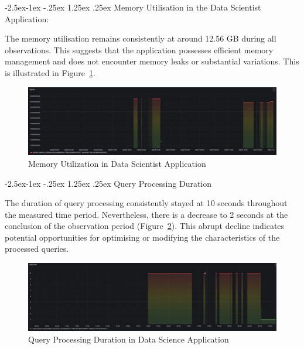 \documentclass[preprint,12pt]{elsarticle}
\makeatletter
\renewcommand\paragraph{\@startsection{paragraph}{4}{\z@}%
            {-2.5ex\@plus -1ex \@minus -.25ex}%
            {1.25ex \@plus .25ex}%
            {\normalfont\normalsize\itshape}}
\makeatother
\begin{document}
\paragraph{Memory Utilisation in the Data Scientist Application:}

The memory utilisation remains consistently at around 12.56 GB during all observations. This suggests that the application possesses efficient memory management and does not encounter memory leaks or substantial variations. This is illustrated in Figure~\ref{memoryUtilizationInDataScientistApplication}.

\begin{figure}[ht]

  \centering

  \includegraphics[width=\textwidth]{images/memory-utilization-in-data-scientist-application.png}

  \caption{Memory Utilization in Data Scientist Application}

  \label{memoryUtilizationInDataScientistApplication}

\end{figure}

\paragraph{Query Processing Duration}

The duration of query processing consistently stayed at 10 seconds throughout the measured time period. Nevertheless, there is a decrease to 2 seconds at the conclusion of the observation period (Figure~\ref{queryProcessingDurationInDataScienceApplication}). This abrupt decline indicates potential opportunities for optimising or modifying the characteristics of the processed queries.

\begin{figure}[ht]

  \centering

  \includegraphics[width=\textwidth]{images/query-processing-duration-in-data-science-application.png}

  \caption{Query Processing Duration in Data Science Application}

  \label{queryProcessingDurationInDataScienceApplication}

\end{figure}
\end{document}

